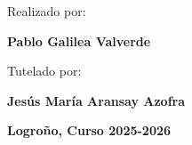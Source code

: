 \begin{titlepage}
\begin{center}
        \vspace*{0.2in}
        \begin{large}
            Realizado por:\\
        \end{large}
        \vspace*{0.1in}
        \begin{Large}
            \textbf{Pablo Galilea Valverde\\}
        \end{Large}
        \vspace*{0.2in}
        \begin{large}
            Tutelado por:\\
        \end{large}
        \vspace*{0.1in}

        \begin{Large}
            \textbf{Jesús María Aransay Azofra\\}
        \end{Large}

        \vspace*{0.8in}
        \textbf{Logroño, Curso 2025-2026}

    \end{center}

\end{titlepage}
